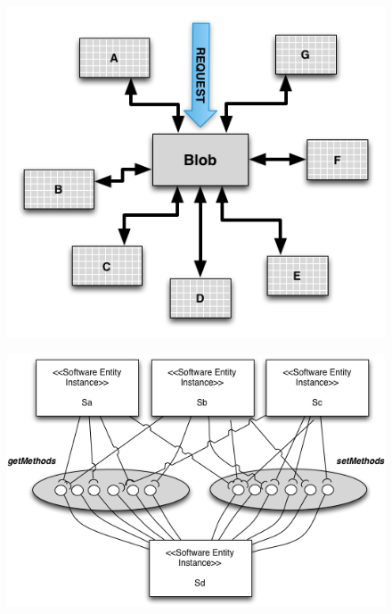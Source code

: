 \documentclass{report}
\begin{document}
\begin{figure}[h]
\begin{minipage}{.5\textwidth}
\centering
\includegraphics[width=1\textwidth]{./images/BLOB.png}
\label{fig:godclass}
\end{minipage}
\begin{minipage}{.5\textwidth}
\centering
\includegraphics[width=1\textwidth]{./images/blob2.png}
\label{fig:godclass2}
\end{minipage}
\end{figure}
\end{document}
